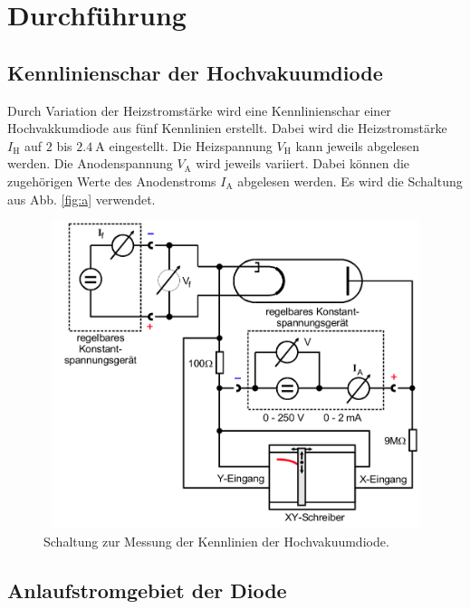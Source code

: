 \section{Durchführung}
\label{sec:Durchführung}

\subsection{Kennlinienschar der Hochvakuumdiode}
Durch Variation der Heizstromstärke wird eine Kennlinienschar 
einer Hochvakkumdiode aus fünf Kennlinien erstellt.
Dabei wird die Heizstromstärke $I_\text{H}$ auf $\num{2}$
bis $\SI{2.4}{\ampere}$ eingestellt.
Die Heizspannung $V_\text{H}$ kann jeweils abgelesen werden.
Die Anodenspannung $V_\text{A}$ wird jeweils variiert.
Dabei können die zugehörigen Werte des Anodenstroms $I_\text{A}$
abgelesen werden. Es wird die Schaltung aus Abb. \ref{fig:a}
verwendet.
\begin{figure}
    \centering
    \includegraphics[width=12cm, height=9cm]{build/a.png}
    \caption{Schaltung zur Messung der Kennlinien der Hochvakuumdiode. \cite{V504}}
    \label{fig:c}
\end{figure}

\subsection{Anlaufstromgebiet der Diode}

